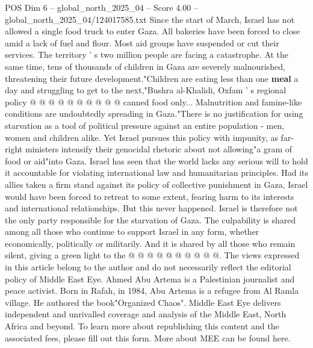 \begin{textsample}{POS Dim 6 – global\_north\_2025\_04 – Score 4.00 – global\_north\_2025\_04/124017585.txt}
Since the start of March, Israel has not allowed a single food truck to enter Gaza.
All bakeries have been forced to close amid a lack of fuel and flour.
Most aid groups have suspended or cut their services.
The territory ' s two million people are facing a catastrophe.
At the same time, tens of thousands of children in Gaza are severely malnourished, threatening their future development."Children are eating less than one \textbf{meal} a day and struggling to get to the next,"Bushra al-Khalidi, Oxfam ' s regional policy @ @ @ @ @ @ @ @ @ @ canned food only...
Malnutrition and famine-like conditions are undoubtedly spreading in Gaza."There is no justification for using starvation as a tool of political pressure against an entire population - men, women and children alike.
Yet Israel pursues this policy with impunity, as far-right ministers intensify their genocidal rhetoric about not allowing"a gram of food or aid"into Gaza.
Israel has seen that the world lacks any serious will to hold it accountable for violating international law and humanitarian principles.
Had its allies taken a firm stand against its policy of collective punishment in Gaza, Israel would have been forced to retreat to some extent, fearing harm to its interests and international relationships.
But this never happened.
Israel is therefore not the only party responsible for the starvation of Gaza.
The culpability is shared among all those who continue to support Israel in any form, whether economically, politically or militarily.
And it is shared by all those who remain silent, giving a green light to the @ @ @ @ @ @ @ @ @ @.
The views expressed in this article belong to the author and do not necessarily reflect the editorial policy of Middle East Eye.
Ahmed Abu Artema is a Palestinian journalist and peace activist.
Born in Rafah, in 1984, Abu Artema is a refugee from Al Ramla village.
He authored the book"Organized Chaos".
Middle East Eye delivers independent and unrivalled coverage and analysis of the Middle East, North Africa and beyond.
To learn more about republishing this content and the associated fees, please fill out this form.
More about MEE can be found here.

\end{textsample}

